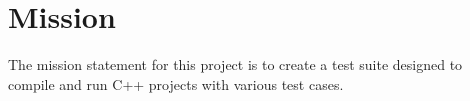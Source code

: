 
\chapter{Mission}

The mission statement for this project is to create a test suite designed to compile and run C++ projects with various test cases.

\let\cleardoublepage\clearpage